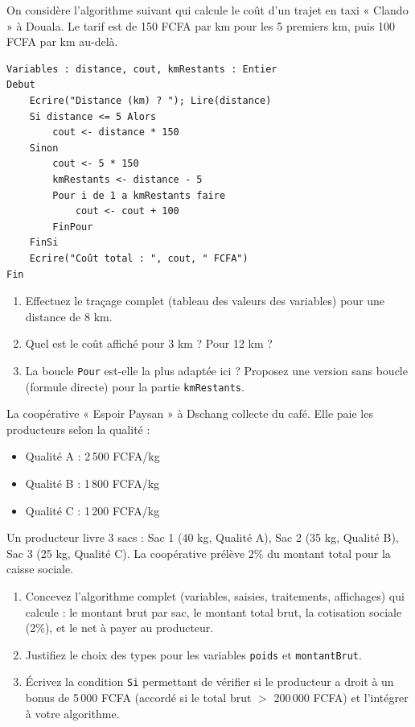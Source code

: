 \documentclass[11pt]{article}
\begin{document}
\begin{exercice}
On considère l'algorithme suivant qui calcule le coût d'un trajet en taxi « Clando » à Douala. Le tarif est de 150 FCFA par km pour les 5 premiers km, puis 100 FCFA par km au-delà.
\begin{verbatim}
Variables : distance, cout, kmRestants : Entier
Debut
    Ecrire("Distance (km) ? "); Lire(distance)
    Si distance <= 5 Alors
        cout <- distance * 150
    Sinon
        cout <- 5 * 150
        kmRestants <- distance - 5
        Pour i de 1 a kmRestants faire
            cout <- cout + 100
        FinPour
    FinSi
    Ecrire("Coût total : ", cout, " FCFA")
Fin
\end{verbatim}
\begin{enumerate}
    \item Effectuez le traçage complet (tableau des valeurs des variables) pour une distance de 8 km.
    \item Quel est le coût affiché pour 3 km ? Pour 12 km ?
    \item La boucle \texttt{Pour} est-elle la plus adaptée ici ? Proposez une version sans boucle (formule directe) pour la partie \texttt{kmRestants}.
\end{enumerate}
\end{exercice}

\begin{exercice}
La coopérative « Espoir Paysan » à Dschang collecte du café. Elle paie les producteurs selon la qualité :
\begin{itemize}
    \item Qualité A : 2\,500 FCFA/kg
    \item Qualité B : 1\,800 FCFA/kg
    \item Qualité C : 1\,200 FCFA/kg
\end{itemize}
Un producteur livre 3 sacs : Sac 1 (40 kg, Qualité A), Sac 2 (35 kg, Qualité B), Sac 3 (25 kg, Qualité C). La coopérative prélève 2\% du montant total pour la caisse sociale.
\begin{enumerate}
    \item Concevez l'algorithme complet (variables, saisies, traitements, affichages) qui calcule : le montant brut par sac, le montant total brut, la cotisation sociale (2\%), et le net à payer au producteur.
    \item Justifiez le choix des types pour les variables \texttt{poids} et \texttt{montantBrut}.
    \item Écrivez la condition \texttt{Si} permettant de vérifier si le producteur a droit à un bonus de 5\,000 FCFA (accordé si le total brut $>$ 200\,000 FCFA) et l'intégrer à votre algorithme.
\end{enumerate}
\end{exercice}
\end{document}
